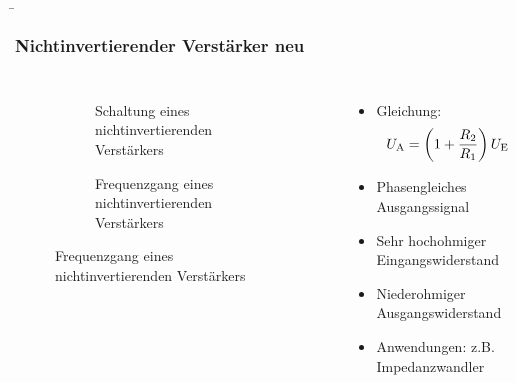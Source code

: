 \begin{frame}
    \b{
    \frametitle{Nichtinvertierender Verstärker neu}
    \begin{columns}
        \centering
        \begin{figure}
    \centering

    \begin{subfigure}{\linewidth}
        \centering
        \resizebox{0.6\linewidth}{!}{}
        \caption{Schaltung eines nichtinvertierenden Verstärkers}
    \end{subfigure}

    \vspace{0.5cm} 

    \begin{subfigure}{\linewidth}
        \centering
        \resizebox{0.6\linewidth}{!}{}
        \caption{Frequenzgang eines nichtinvertierenden Verstärkers}
    \end{subfigure}

\end{figure}

        \begin{itemize}
            \item Gleichung:
            \[
            U_{\textnormal{A}} = \left(1+\frac{R_2}{R_1}\right) U_{\textnormal{E}}
            \]
            \item Phasengleiches Ausgangssignal
            \item Sehr hochohmiger Eingangswiderstand
            \item Niederohmiger Ausgangswiderstand
            \item Anwendungen: z.B. Impedanzwandler
        \end{itemize}
    \end{columns}
    }
\end{frame}



